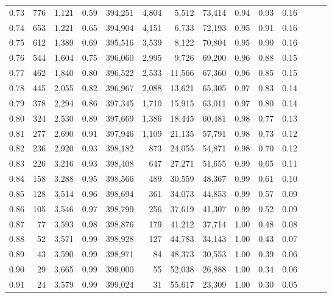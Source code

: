 \begin{tabular}{rrrrrrrrrrrrrr}
0.73 &    776 &  1,121 &  0.59 &  394,251 &    4,804 &   5,512 &  73,414 &  0.94 &  0.93 &      0.16 \\
0.74 &    653 &  1,221 &  0.65 &  394,904 &    4,151 &   6,733 &  72,193 &  0.95 &  0.91 &      0.16 \\
0.75 &    612 &  1,389 &  0.69 &  395,516 &    3,539 &   8,122 &  70,804 &  0.95 &  0.90 &      0.16 \\
0.76 &    544 &  1,604 &  0.75 &  396,060 &    2,995 &   9,726 &  69,200 &  0.96 &  0.88 &      0.15 \\
0.77 &    462 &  1,840 &  0.80 &  396,522 &    2,533 &  11,566 &  67,360 &  0.96 &  0.85 &      0.15 \\
0.78 &    445 &  2,055 &  0.82 &  396,967 &    2,088 &  13,621 &  65,305 &  0.97 &  0.83 &      0.14 \\
0.79 &    378 &  2,294 &  0.86 &  397,345 &    1,710 &  15,915 &  63,011 &  0.97 &  0.80 &      0.14 \\
0.80 &    324 &  2,530 &  0.89 &  397,669 &    1,386 &  18,445 &  60,481 &  0.98 &  0.77 &      0.13 \\
0.81 &    277 &  2,690 &  0.91 &  397,946 &    1,109 &  21,135 &  57,791 &  0.98 &  0.73 &      0.12 \\
0.82 &    236 &  2,920 &  0.93 &  398,182 &      873 &  24,055 &  54,871 &  0.98 &  0.70 &      0.12 \\
0.83 &    226 &  3,216 &  0.93 &  398,408 &      647 &  27,271 &  51,655 &  0.99 &  0.65 &      0.11 \\
0.84 &    158 &  3,288 &  0.95 &  398,566 &      489 &  30,559 &  48,367 &  0.99 &  0.61 &      0.10 \\
0.85 &    128 &  3,514 &  0.96 &  398,694 &      361 &  34,073 &  44,853 &  0.99 &  0.57 &      0.09 \\
0.86 &    105 &  3,546 &  0.97 &  398,799 &      256 &  37,619 &  41,307 &  0.99 &  0.52 &      0.09 \\
0.87 &     77 &  3,593 &  0.98 &  398,876 &      179 &  41,212 &  37,714 &  1.00 &  0.48 &      0.08 \\
0.88 &     52 &  3,571 &  0.99 &  398,928 &      127 &  44,783 &  34,143 &  1.00 &  0.43 &      0.07 \\
0.89 &     43 &  3,590 &  0.99 &  398,971 &       84 &  48,373 &  30,553 &  1.00 &  0.39 &      0.06 \\
0.90 &     29 &  3,665 &  0.99 &  399,000 &       55 &  52,038 &  26,888 &  1.00 &  0.34 &      0.06 \\
0.91 &     24 &  3,579 &  0.99 &  399,024 &       31 &  55,617 &  23,309 &  1.00 &  0.30 &      0.05 \\

\end{tabular}
